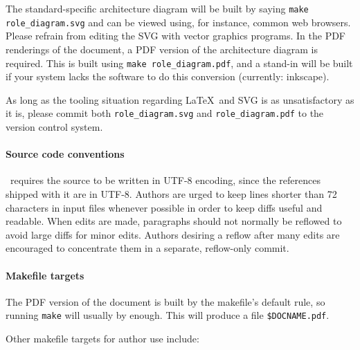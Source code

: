 \documentclass[11pt,a4paper]{ivoa}
\begin{document}
The standard-specific
architecture diagram will be built by saying \texttt{make
role\_diagram.svg} and can be viewed using, for instance, common web
browsers.  Please refrain from editing the SVG with vector graphics
programs.  In the PDF renderings of the document, 
a PDF version of the architecture diagram is
required.  This is built using \texttt{make role\_diagram.pdf}, and a
stand-in will be built if your system lacks the software to do this
conversion (currently: inkscape).

As long as the tooling situation regarding \LaTeX~and SVG is as
unsatisfactory as it is, please commit both \texttt{role\_diagram.svg} and
\texttt{role\_diagram.pdf} to the version control system.

\paragraph{Source code conventions}

\ivoatex\ requires the source to be written in UTF-8 encoding, since the
references shipped with it are in UTF-8.
Authors are urged to keep lines shorter than 72 characters in input
files whenever possible in order to keep diffs useful and readable.
When edits are made, paragraphs should not normally be reflowed to avoid
large diffs for minor edits.  Authors desiring a reflow after many edits
are encouraged to concentrate them in a separate, reflow-only commit.

\paragraph{Makefile targets}

The PDF version of the document is built by the makefile's default rule,
so running \texttt{make} will usually by enough.  This will produce a
file \texttt{\$DOCNAME.pdf}.

Other makefile targets for author use include:
\end{document}
